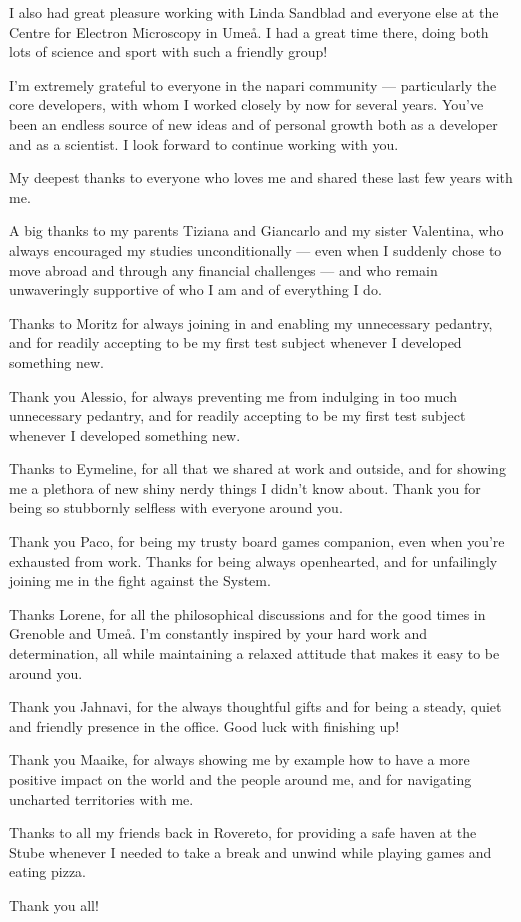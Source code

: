 I also had great pleasure working with Linda Sandblad and everyone else at the Centre for Electron Microscopy in Umeå. I had a great time there, doing both lots of science and sport with such a friendly group!

I'm extremely grateful to everyone in the napari community --- particularly the core developers, with whom I worked closely by now for several years. You've been an endless source of new ideas and of personal growth both as a developer and as a scientist. I look forward to continue working with you.

\bigskip

My deepest thanks to everyone who loves me and shared these last few years with me.

A big thanks to my parents Tiziana and Giancarlo and my sister Valentina, who always encouraged my studies unconditionally --- even when I suddenly chose to move abroad and through any financial challenges --- and who remain unwaveringly supportive of who I am and of everything I do.

Thanks to Moritz for always joining in and enabling my unnecessary pedantry, and for readily accepting to be my first test subject whenever I developed something new.

Thank you Alessio, for always preventing me from indulging in too much unnecessary pedantry, and for readily accepting to be my first test subject whenever I developed something new.

Thanks to Eymeline, for all that we shared at work and outside, and for showing me a plethora of new shiny nerdy things I didn't know about. Thank you for being so stubbornly selfless with everyone around you.

Thank you Paco, for being my trusty board games companion, even when you're exhausted from work. Thanks for being always openhearted, and for unfailingly joining me in the fight against the System. 

Thanks Lorene, for all the philosophical discussions and for the good times in Grenoble and Umeå. I'm constantly inspired by your hard work and determination, all while maintaining a relaxed attitude that makes it easy to be around you.

Thank you Jahnavi, for the always thoughtful gifts and for being a steady, quiet and friendly presence in the office. Good luck with finishing up!

Thank you Maaike, for always showing me by example how to have a more positive impact on the world and the people around me, and for navigating uncharted territories with me.

Thanks to all my friends back in Rovereto, for providing a safe haven at the Stube whenever I needed to take a break and unwind while playing games and eating pizza.

\bigskip

Thank you all!
